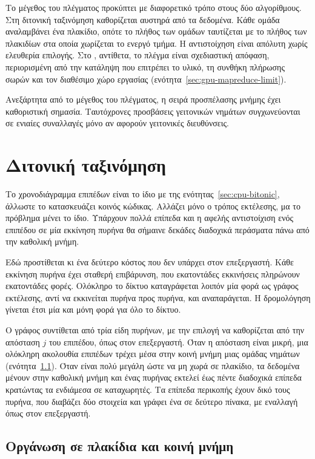 Το μέγεθος του πλέγματος προκύπτει με διαφορετικό τρόπο στους δύο αλγορίθμους.
Στη διτονική ταξινόμηση καθορίζεται αυστηρά από τα δεδομένα. Κάθε ομάδα
αναλαμβάνει ένα πλακίδιο, οπότε το πλήθος των ομάδων ταυτίζεται με το πλήθος
των πλακιδίων στα οποία χωρίζεται το ενεργό τμήμα. Η αντιστοίχηση είναι απόλυτη
χωρίς ελευθερία επιλογής. Στο , αντίθετα, το πλέγμα είναι
σχεδιαστική απόφαση, περιορισμένη από την κατάληψη που επιτρέπει το υλικό, τη
συνθήκη πλήρωσης σωρών και τον διαθέσιμο χώρο εργασίας
(ενότητα~\ref{sec:gpu-mapreduce-limit}).

Ανεξάρτητα από το μέγεθος του πλέγματος, η σειρά προσπέλασης μνήμης έχει
καθοριστική σημασία. Ταυτόχρονες προσβάσεις γειτονικών νημάτων συγχωνεύονται σε
ενιαίες συναλλαγές μόνο αν αφορούν γειτονικές διευθύνσεις.

\section{Διτονική ταξινόμηση}
\label{sec:gpu-bitonic}

Το χρονοδιάγραμμα επιπέδων είναι το ίδιο με της ενότητας~\ref{sec:cpu-bitonic},
άλλωστε το κατασκευάζει κοινός κώδικας. Αλλάζει μόνο ο τρόπος εκτέλεσης, μα το
πρόβλημα μένει το ίδιο. Υπάρχουν πολλά επίπεδα και η αφελής αντιστοίχιση ενός
επιπέδου σε μία εκκίνηση πυρήνα θα σήμαινε δεκάδες διαδοχικά περάσματα πάνω από
την καθολική μνήμη.

Εδώ προστίθεται κι ένα δεύτερο κόστος που δεν υπάρχει στον επεξεργαστή. Κάθε
εκκίνηση πυρήνα έχει σταθερή επιβάρυνση, που εκατοντάδες εκκινήσεις πληρώνουν
εκατοντάδες φορές. Ολόκληρο το δίκτυο καταγράφεται λοιπόν μία φορά ως γράφος
εκτέλεσης, αντί να εκκινείται πυρήνα προς πυρήνα, και αναπαράγεται. Η
δρομολόγηση γίνεται έτσι μία και μόνη φορά για όλο το δίκτυο.

Ο γράφος συντίθεται από τρία είδη πυρήνων, με την επιλογή να καθορίζεται από
την απόσταση $j$ του επιπέδου, όπως στον επεξεργαστή. Όταν η απόσταση είναι
μικρή, μια ολόκληρη ακολουθία επιπέδων τρέχει μέσα στην κοινή μνήμη μιας ομάδας
νημάτων (ενότητα~\ref{sec:gpu-bitonic-tiles}). Όταν είναι πολύ μεγάλη ώστε να
μη χωρά σε πλακίδιο, τα δεδομένα μένουν στην καθολική μνήμη και ένας πυρήνας
εκτελεί έως πέντε διαδοχικά επίπεδα κρατώντας τα ενδιάμεσα σε καταχωρητές. Τα
επίπεδα περικοπής έχουν δικό τους πυρήνα, που διαβάζει δύο στοιχεία και γράφει
ένα σε δεύτερο πίνακα, με εναλλαγή όπως στον επεξεργαστή.

\subsection{Οργάνωση σε πλακίδια και κοινή μνήμη}
\label{sec:gpu-bitonic-tiles}

